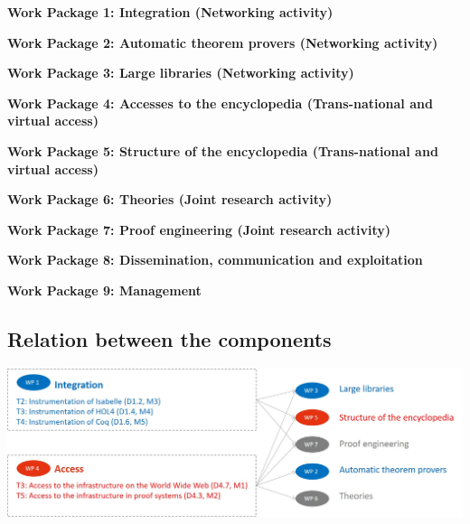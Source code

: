 \begin{workplan}


  \newcommand\na{(Networking activity)}
  \newcommand\tnva{(Trans-national and virtual access)}
  \newcommand\jra{(Joint research activity)}
  \newcommand\titlewp[3]{\bigskip\noindent\colorbox{color3}{\begin{minipage}\textwidth\bf Work Package #1: #2\end{minipage}}}

\titlewp{1}{Integration \na}{instrumentation}

\titlewp{2}{Automatic theorem provers \na}{atpetc}

\titlewp{3}{Large libraries \na}{libraries}

\titlewp{4}{Accesses to the encyclopedia \tnva}{access}

\titlewp{5}{Structure of the encyclopedia \tnva}{structuring}

\titlewp{6}{Theories \jra}{theories}

\titlewp{7}{Proof engineering \jra}{alignment}

\titlewp{8}{Dissemination, communication and exploitation}{dissemination}

\titlewp{9}{Management}{management}

\end{workplan}



\subsection{Relation between the components}

\includegraphics[width=\textwidth]{PERT}
